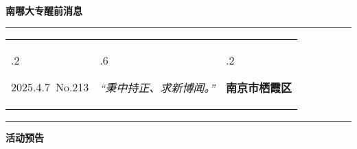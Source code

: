 \documentclass[letterpaper, 12pt]{article}
\begin{document}
\begin{center}
    \Huge\textbf{南哪大专醒前消息}
\end{center}
\vspace{4mm}
\hrule
\renewcommand\tabularxcolumn[1]{m{#1}}
\begin{tabularx}{\textwidth}{>{\hsize.2\hsize}X>{\hsize.6\hsize}X>{\hsize.2\hsize}X}
    \begin{flushleft}
        2025.4.7\, No.213
    \end{flushleft}
    &
    \begin{center}
        \textit{“秉中持正、求新博闻。”}
    \end{center}
    &
    \begin{flushright}
        \textbf{南京市栖霞区}
    \end{flushright}
\end{tabularx}
\vspace{-3.5mm}
\hrule
\vspace{4mm}
\centerline{\huge\textbf{活动预告}}
\end{document}
